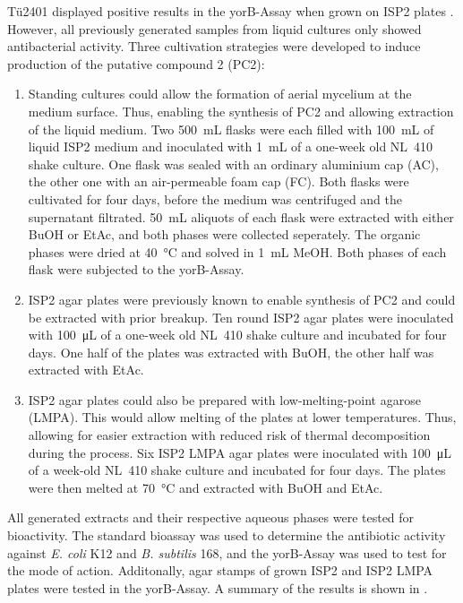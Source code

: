     Tü2401 displayed positive results in the yorB-Assay  when grown on ISP2 plates . However, all previously generated samples from liquid cultures only showed antibacterial activity.
    Three cultivation strategies were developed to induce production of the putative compound 2 (PC2):

    \begin{enumerate}
        \item Standing cultures could allow the formation of aerial mycelium at the medium surface. Thus, enabling the synthesis of PC2 and allowing extraction of the liquid medium. Two \SI{500}{\milli\liter} flasks were each filled with \SI{100}{\milli\liter} of liquid ISP2 medium and inoculated with \SI{1}{\milli\liter} of a one-week old NL~410 shake culture. One flask was sealed with an ordinary aluminium cap (AC), the other one with an air-permeable foam cap (FC). Both flasks were cultivated for four days, before the medium was centrifuged and the supernatant filtrated. \SI{50}{\milli\liter} aliquots of each flask were extracted with either BuOH or EtAc, and both phases were collected seperately. The organic phases were dried at \SI{40}{\celsius} and solved in \SI{1}{\milli\liter} MeOH. Both phases of each flask were subjected to the yorB-Assay.
        \item ISP2 agar plates were previously known to enable synthesis of PC2 and could be extracted with prior breakup. Ten round ISP2 agar plates were inoculated with \SI{100}{\micro\liter} of a one-week old NL~410 shake culture and incubated for four days. One half of the plates was extracted with BuOH, the other half was extracted with EtAc.
        \item ISP2 agar plates could also be prepared with low-melting-point agarose (LMPA). This would allow melting of the plates at lower temperatures. Thus, allowing for easier extraction with reduced risk of thermal decomposition during the process. Six ISP2 LMPA agar plates were inoculated with \SI{100}{\micro\liter} of a week-old NL~410 shake culture and incubated for four days. The plates were then melted at \SI{70}{\celsius} and extracted with BuOH and EtAc.
    \end{enumerate}

    All generated extracts and their respective aqueous phases were tested for bioactivity. The standard bioassay was used to determine the antibiotic activity against \textit{E. coli} K12 and \textit{B. subtilis} 168, and the yorB-Assay was used to test for the mode of action. Additonally, agar stamps of grown ISP2 and ISP2 LMPA plates were tested in the yorB-Assay. A summary of the results is shown in .

